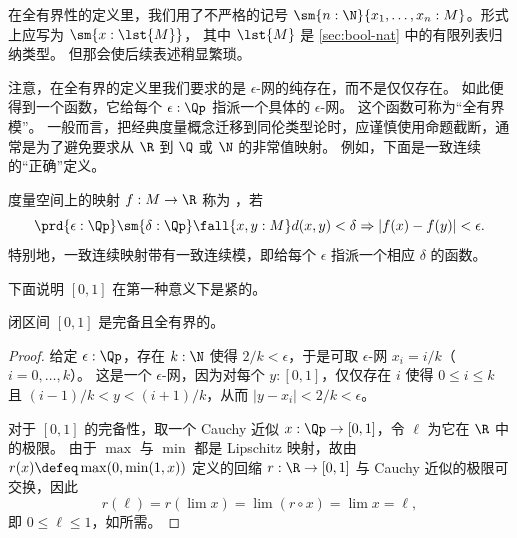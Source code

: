 \begin{rmk}
  在全有界性的定义里，我们用了不严格的记号 $\sm{n : \N}{x_1, \ldots, x_n : M}$。形式上应写为 $\sm{x : \lst{M}}$，
  其中 $\lst{M}$ 是 \cref{sec:bool-nat} 中的有限列表归纳类型。
  但那会使后续表述稍显繁琐。
\end{rmk}

注意，在全有界的定义里我们要求的是 $\epsilon$-网的纯存在，而不是仅仅存在。
如此便得到一个函数，它给每个 $\epsilon : \Qp$ 指派一个具体的 $\epsilon$-网。
这个函数可称为“全有界模”。
一般而言，把经典度量概念迁移到同伦类型论时，应谨慎使用命题截断，通常是为了避免要求从 $\R$ 到 $\Q$ 或 $\N$ 的非常值映射。
例如，下面是一致连续的“正确”定义。

\begin{defn} \label{defn:uniformly-continuous}
  度量空间上的映射 $f : M \to \R$ 称为
  ，若
  \begin{equation*}
    \prd{\epsilon : \Qp}
    \sm{\delta : \Qp}
    \fall{x, y : M}
    d(x,y) < \delta \Rightarrow |f(x) - f(y)| < \epsilon.
  \end{equation*}
  特别地，一致连续映射带有一致连续模，即给每个 $\epsilon$ 指派一个相应 $\delta$ 的函数。
\end{defn}

下面说明 $[0,1]$ 在第一种意义下是紧的。

\begin{thm} \label{analysis-interval-ctb}
  闭区间 $[0,1]$ 是完备且全有界的。
\end{thm}

\begin{proof}
  给定 $\epsilon : \Qp$，存在 $k : \N$ 使得 $2/k < \epsilon$，于是可取 $\epsilon$-网 $x_i = i/k$（$i = 0, \ldots, k$）。
  这是一个 $\epsilon$-网，因为对每个 $y : [0,1]$，仅仅存在 $i$ 使得 $0 \leq i \leq k$ 且 $(i -
  1)/k < y < (i+1)/k$，从而 $|y - x_i| < 2/k < \epsilon$。

  对于 $[0,1]$ 的完备性，取一个 Cauchy 近似 $x : \Qp \to
  [0,1]$，令 $\ell$ 为它在 $\R$ 中的极限。
  由于 $\max$ 与 $\min$ 都是 Lipschitz 映射，故由
  $r(x) \defeq \max(0, \min(1, x))$ 定义的回缩 $r : \R \to [0,1]$ 与 Cauchy 近似的极限可交换，因此
  \begin{equation*}
    r(\ell) =
    r (\lim x) =
    \lim (r \circ x) =
    \lim x =
    \ell,
  \end{equation*}
  即 $0 \leq \ell \leq 1$，如所需。
\end{proof}

